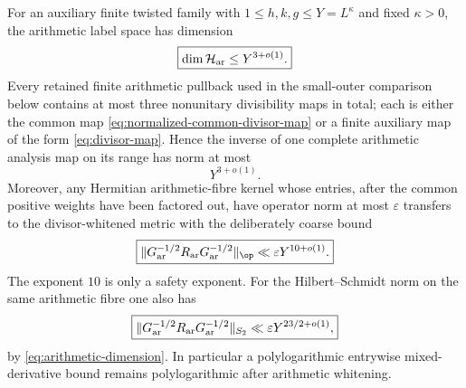 \begin{lemma}
\label{lem:arithmetic-loss}
For an auxiliary finite twisted family with
$1\le h,k,g\le Y=L^\kappa$ and fixed $\kappa>0$, the arithmetic label space
has dimension
\begin{equation}
\boxed{\dim\mathcal H_{\rm ar}\le Y^{3+o(1)}.}
\label{eq:arithmetic-dimension}
\end{equation}
Every retained finite arithmetic pullback used in the small-outer comparison below
contains at most three nonunitary divisibility maps in total; each is either the common map
\eqref{eq:normalized-common-divisor-map} or a finite auxiliary map of the form
\eqref{eq:divisor-map}. Hence the inverse of one complete arithmetic analysis
map on its range has norm at most
\begin{equation}
\boxed{Y^{3+o(1)}.}
\label{eq:arithmetic-loss}
\end{equation}
Moreover, any Hermitian arithmetic-fibre kernel whose entries, after the common
positive weights have been factored out, have operator norm at most
$\varepsilon$ transfers to the divisor-whitened metric with the deliberately
coarse bound
\begin{equation}
\boxed{
\|G_{\rm ar}^{-1/2}R_{\rm ar}G_{\rm ar}^{-1/2}\|_{\op}
\ll \varepsilon Y^{10+o(1)}.
}
\label{eq:arithmetic-two-sided-transfer}
\end{equation}
The exponent $10$ is only a safety exponent.
For the Hilbert--Schmidt norm on the same arithmetic fibre one also has
\begin{equation}
\boxed{
\|G_{\rm ar}^{-1/2}R_{\rm ar}G_{\rm ar}^{-1/2}\|_{S_2}
\ll \varepsilon Y^{23/2+o(1)},
}
\label{eq:arithmetic-two-sided-HS-transfer}
\end{equation}
by \eqref{eq:arithmetic-dimension}. In particular a polylogarithmic
entrywise mixed-derivative bound remains polylogarithmic after arithmetic
whitening.
\end{lemma}

